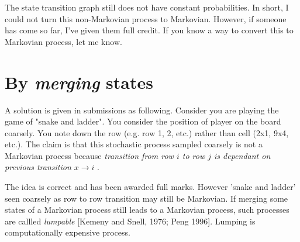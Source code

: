 \documentclass[a4paper,10pt]{article}
\begin{document}

The state transition graph still does not have constant probabilities. In
short, I could not turn this non-Markovian process to Markovian. However, if
someone has come so far, I've given them full credit. If you know a way to
convert this to Markovian process, let me know.

\section{By \emph{merging} states}


A solution is given in submissions as following. Consider you are playing the
game of "snake and ladder".  You consider the position of player on the board
coarsely. You note down the row (e.g. row 1, 2, etc.) rather than cell (2x1,
9x4, etc.). The claim is that this stochastic process sampled coarsely is not a
Markovian process because \emph{transition from row $i$ to row $j$ is dependant
on previous transition $x \rightarrow i$ }. 

The idea is correct and has been awarded full marks. However 'snake and ladder'
seen coarsely as row to row transition may still be Markovian. If merging some
states of a Markovian process still leads to a Markovian process, such processes
are callled \emph{lumpable} [Kemeny and Snell, 1976; Peng 1996]. Lumping is
computationally expensive process.
\end{document}
